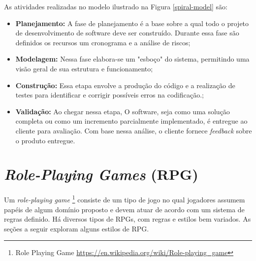 
As atividades realizadas no modelo ilustrado na Figura \ref{spiral-model} são:
\begin{itemize}
    \item \textbf{Planejamento:} A fase de planejamento é a base sobre a qual todo o projeto de desenvolvimento de software deve ser construído. Durante essa fase são definidos os recursos um cronograma e a análise de riscos;
    \item \textbf{Modelagem:} Nessa fase elabora-se um "esboço" do sistema, permitindo uma visão geral de sua estrutura e funcionamento;
    \item \textbf{Construção:} Essa etapa envolve a produção do código e a realização de testes para identificar e corrigir possíveis erros na codificação.;
    \item \textbf{Validação:} Ao chegar nessa etapa, O software, seja como uma solução completa ou como um incremento parcialmente implementado, é entregue ao cliente para avaliação. Com base nessa análise, o cliente fornece \textit{feedback} sobre o produto entregue.
\end{itemize}


\section{\textit{Role-Playing Games} (RPG)}
\label{sec:rpg}

Um \textit{role-playing game} \footnote{Role Playing Game \url{https://en.wikipedia.org/wiki/Role-playing_game}} consiste de um tipo de jogo no qual jogadores assumem papéis de algum domínio proposto e devem atuar de acordo com um sistema de regras definido. Há diversos tipos de RPGs, com regras e estilos bem variados. As seções a seguir exploram alguns estilos de RPG.

